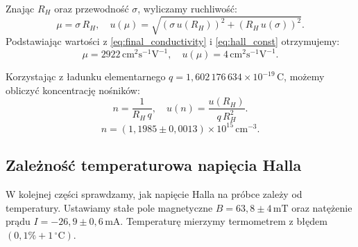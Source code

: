 \documentclass[12pt]{article}
\begin{document}
Znając $R_H$ oraz przewodność $\sigma$, wyliczamy ruchliwość:
\[
    \mu = \sigma\,R_H, 
    \quad 
    u(\mu) = \sqrt{(\sigma\,u(R_H))^2 + (R_H\,u(\sigma))^2}.
\]
Podstawiając wartości z \eqref{eq:final_conductivity} i \eqref{eq:hall_const} otrzymujemy:
\begin{equation}
    \mu = 2922\,\mathrm{cm}^2\mathrm{s}^{-1}\mathrm{V}^{-1}, 
    \quad 
    u(\mu) = 4\,\mathrm{cm}^2\mathrm{s}^{-1}\mathrm{V}^{-1}.
    \label{eq:mobility}
\end{equation}

Korzystając z ładunku elementarnego \cite{charge} $q = 1{,}602\,176\,634 \times 10^{-19}\,\mathrm{C}$, możemy obliczyć koncentrację nośników:
\[
    n = \frac{1}{R_H\,q}, 
    \quad 
    u(n) = \frac{u(R_H)}{q\,R_H^2}.
\]
\begin{equation}
    n = (1{,}1985 \pm 0{,}0013)\times 10^{15}\,\mathrm{cm}^{-3}.
    \label{eq:density}
\end{equation}

\subsection{Zależność temperaturowa napięcia Halla}
W kolejnej części sprawdzamy, jak napięcie Halla na próbce zależy od temperatury. Ustawiamy stałe pole magnetyczne $B = 63{,}8 \pm 4\,\mathrm{mT}$ oraz natężenie prądu $I = -26{,}9 \pm 0{,}6\,\mathrm{mA}$. Temperaturę mierzymy termometrem z błędem $(0{,}1\% + 1\,^\circ\mathrm{C})$.
\end{document}
